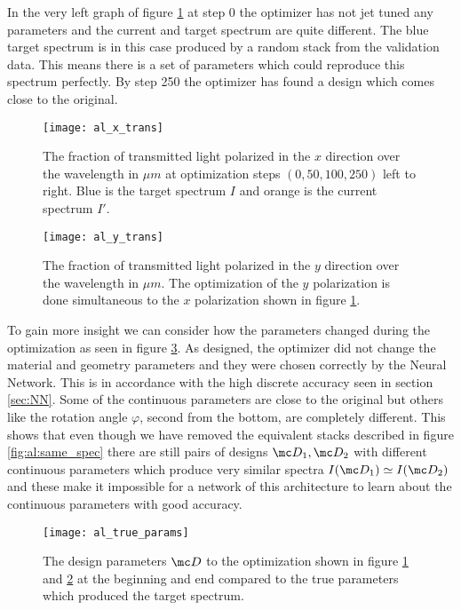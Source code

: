 \indent
In the very left graph of figure \ref{fig:al:x_trans} at step 0 the 
optimizer has not jet tuned any parameters and the current and target spectrum are quite different. The blue target spectrum is in this case produced by a random stack from the validation data. This means there is a set of parameters which could reproduce this spectrum perfectly. By step 250 the optimizer has found a design which comes close to the original.

\begin{figure}[H]
    \centering
    \texttt{[image: al\_x\_trans]}
    \caption{The fraction of transmitted light polarized in the $x$ direction over the wavelength in $\mu m$ at optimization steps 
    $(0, 50, 100, 250)$ left to right. Blue is the target spectrum $I$ and orange is the current spectrum $I'$.}
    \label{fig:al:x_trans}
\end{figure}

\begin{figure}[H]
    \centering
    \texttt{[image: al\_y\_trans]}
    \caption{The fraction of transmitted light polarized in the $y$ direction over the wavelength in $\mu m$. The optimization of the $y$ polarization is done simultaneous to the $x$ polarization shown in figure \ref{fig:al:x_trans}.}
    \label{fig:al:y_trans}
\end{figure}

To gain more insight we can consider how the parameters changed during the optimization as seen in figure \ref{fig:al:true_params}. As designed, the optimizer did not change the material and geometry parameters and they were chosen correctly by the Neural Network. This is in accordance with the high discrete accuracy seen in section \ref{sec:NN}. Some of the continuous parameters are close to the original but others like the rotation angle $\varphi$, second from the bottom, are completely different. This shows that even though we have removed the equivalent stacks described in figure \ref{fig:al:same_spec} there are still pairs of designs $\mc D_1, \mc D_2$ with different continuous parameters which produce very similar spectra $I \qty(\mc D_1) \simeq I \qty(\mc D_2)$ and these make it impossible for a network of this architecture to learn about the continuous parameters with good accuracy.

\begin{figure}[H]
    \centering
    \texttt{[image: al\_true\_params]}
    \caption{The design parameters $\mc D$ to the optimization shown in figure \ref{fig:al:x_trans} and \ref{fig:al:y_trans} at the beginning and end compared to the true parameters which produced the target spectrum.}
    \label{fig:al:true_params}
\end{figure} 